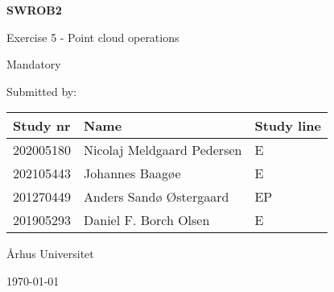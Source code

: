 \begin{titlepage}
	\centering
	\vspace*{6cm}
	{\Huge\bfseries SWROB2\par Exercise 5 - Point cloud operations\par Mandatory\par}
	\vspace{2cm}
	Submitted by: \par 
	\begin{table}[!h]
		\centering
		\begin{tabular}{|l|l|l|}
			\hline
			Study nr  & Name 					   & Study line\\\hline
			202005180 & Nicolaj Meldgaard Pedersen & E\\\hline
			202105443 & Johannes Baagøe 		   & E\\\hline
			201270449 & Anders Sandø Østergaard    & EP\\\hline
			201905293 & Daniel F. Borch Olsen	   & E\\\hline
		\end{tabular}
	\end{table}
	\vspace{4cm}
	Århus Universitet \par
	\vfill
	\today
\end{titlepage}
\thispagestyle{empty}
\tableofcontents
\clearpage